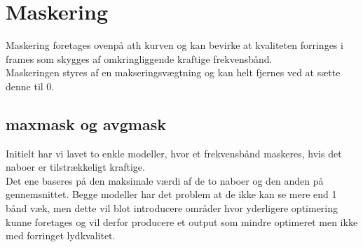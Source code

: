\section{Maskering}
Maskering foretages ovenpå ath kurven og kan bevirke at kvaliteten
forringes i frames som skygges af omkringliggende kraftige
frekvensbånd.\\
Maskeringen styres af en makseringsvægtning og kan helt fjernes ved
at sætte denne til 0.\\
\subsection*{maxmask og avgmask}
Initielt har vi lavet to enkle modeller, hvor et frekvensbånd
maskeres, hvis det naboer er tilstrækkeligt kraftige.\\
Det ene baseres på den maksimale værdi af de to naboer og den anden på
gennemsnittet. Begge modeller har det problem at de ikke kan se mere
end 1 bånd væk, men dette vil blot introducere områder hvor yderligere
optimering kunne foretages og vil derfor producere et output som
mindre optimeret men ikke med forringet lydkvalitet.
